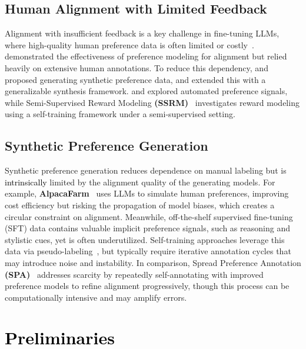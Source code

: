 \documentclass{article} %
\newcommand\fix[1]{\textcolor{black}{#1}}
\newcommand\turnitin[1]{\textcolor{black}{#1}}
\begin{document}
\subsection{Human Alignment with Limited Feedback}
Alignment with insufficient feedback is a key challenge in fine-tuning LLMs, where high-quality human preference data is often limited or costly~\citep{casper2023open}. \citet{Ziegler} demonstrated the effectiveness of preference modeling for alignment but relied heavily on extensive human annotations. To reduce this dependency, \citet{kim2025spreadpreferenceannotationdirect} and \citet{huang-etal-2023-learning-preference} proposed generating synthetic preference data, and \citet{zhou2024anyprefer} extended this with a generalizable synthesis framework. \citet{shi2024saferinstructaligninglanguagemodels} and \citet{liu2023aligning} explored automated preference signals, while Semi-Supervised Reward Modeling \textbf{(SSRM)}~\citep{he-etal-2024-semi-supervised} investigates reward modeling using a self-training framework under a semi-supervised setting.

\subsection{Synthetic Preference Generation}
Synthetic preference generation reduces dependence on manual labeling but is \turnitin{intrinsically} limited by the alignment quality of the generating models. For example, \textbf{AlpacaFarm}~\citep{dubois2023alpacafarm} uses LLMs to simulate human preferences, improving cost efficiency but risking the propagation of model biases, which creates a circular constraint on alignment. Meanwhile, off-the-shelf supervised fine-tuning (SFT) data contains valuable implicit preference signals, such as reasoning and stylistic cues, yet is often underutilized. Self-training approaches leverage this data via pseudo-labeling~\citep{wang2024self}, but typically require iterative annotation cycles that may introduce noise and instability. In comparison, Spread Preference Annotation \textbf{(SPA)}~\citep{kim2025spreadpreferenceannotationdirect} addresses scarcity by repeatedly self-annotating with improved preference models to refine alignment progressively, though this process can be computationally intensive and may amplify errors.

\section{\fix{Preliminaries}}
\label{sec:bays_optimal}
\end{document}
